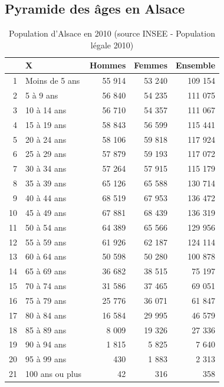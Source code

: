 \documentclass[12pt,english,french,twoside]{book}\usepackage[]{graphicx}\usepackage[]{color}
\begin{document}

\subsection*{Pyramide des âges en Alsace}


\begin{table}[ht]
\centering
\begin{tabular}{rlrrr}
  \hline
 & X & Hommes & Femmes & Ensemble \\ 
  \hline
1 & Moins de 5 ans & 55 914 & 53 240 & 109 154 \\ 
  2 & 5 à 9 ans & 56 840 & 54 235 & 111 075 \\ 
  3 & 10 à 14 ans & 56 710 & 54 357 & 111 067 \\ 
  4 & 15 à 19 ans & 58 843 & 56 599 & 115 441 \\ 
  5 & 20 à 24 ans & 58 106 & 59 818 & 117 924 \\ 
  6 & 25 à 29 ans & 57 879 & 59 193 & 117 072 \\ 
  7 & 30 à 34 ans & 57 264 & 57 915 & 115 179 \\ 
  8 & 35 à 39 ans & 65 126 & 65 588 & 130 714 \\ 
  9 & 40 à 44 ans & 68 519 & 67 953 & 136 472 \\ 
  10 & 45 à 49 ans & 67 881 & 68 439 & 136 319 \\ 
  11 & 50 à 54 ans & 64 389 & 65 566 & 129 956 \\ 
  12 & 55 à 59 ans & 61 926 & 62 187 & 124 114 \\ 
  13 & 60 à 64 ans & 50 598 & 50 280 & 100 878 \\ 
  14 & 65 à 69 ans & 36 682 & 38 515 & 75 197 \\ 
  15 & 70 à 74 ans & 31 586 & 37 465 & 69 051 \\ 
  16 & 75 à 79 ans & 25 776 & 36 071 & 61 847 \\ 
  17 & 80 à 84 ans & 16 584 & 29 995 & 46 579 \\ 
  18 & 85 à 89 ans & 8 009 & 19 326 & 27 336 \\ 
  19 & 90 à 94 ans & 1 815 & 5 825 & 7 640 \\ 
  20 & 95 à 99 ans & 430 & 1 883 & 2 313 \\ 
  21 & 100 ans ou plus &  42 & 316 & 358 \\ 
   \hline
\end{tabular}
\caption[Population d'Alsace en 2010]{Population d'Alsace en 2010 (source INSEE - Population légale 2010)} 
\label{tab:pop_insee}
\end{table}
\end{document}
